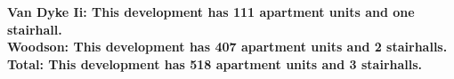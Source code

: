 \bf{Van Dyke Ii}: This development has 111 apartment units and one stairhall.\\\bf{Woodson}: This development has 407 apartment units and 2 stairhalls.\\\bf{Total}: This development has 518 apartment units and 3 stairhalls.\\